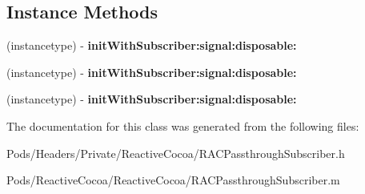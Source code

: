 \subsection*{Instance Methods}
\begin{DoxyCompactItemize}
\item 
\mbox{\label{interface_r_a_c_passthrough_subscriber_afeea1a25a572175fb1a0f0ca51b61013}} 
(instancetype) -\/ {\bfseries init\+With\+Subscriber\+:signal\+:disposable\+:}
\item 
\mbox{\label{interface_r_a_c_passthrough_subscriber_afeea1a25a572175fb1a0f0ca51b61013}} 
(instancetype) -\/ {\bfseries init\+With\+Subscriber\+:signal\+:disposable\+:}
\item 
\mbox{\label{interface_r_a_c_passthrough_subscriber_afeea1a25a572175fb1a0f0ca51b61013}} 
(instancetype) -\/ {\bfseries init\+With\+Subscriber\+:signal\+:disposable\+:}
\end{DoxyCompactItemize}


The documentation for this class was generated from the following files\+:\begin{DoxyCompactItemize}
\item 
Pods/\+Headers/\+Private/\+Reactive\+Cocoa/R\+A\+C\+Passthrough\+Subscriber.\+h\item 
Pods/\+Reactive\+Cocoa/\+Reactive\+Cocoa/R\+A\+C\+Passthrough\+Subscriber.\+m\end{DoxyCompactItemize}
